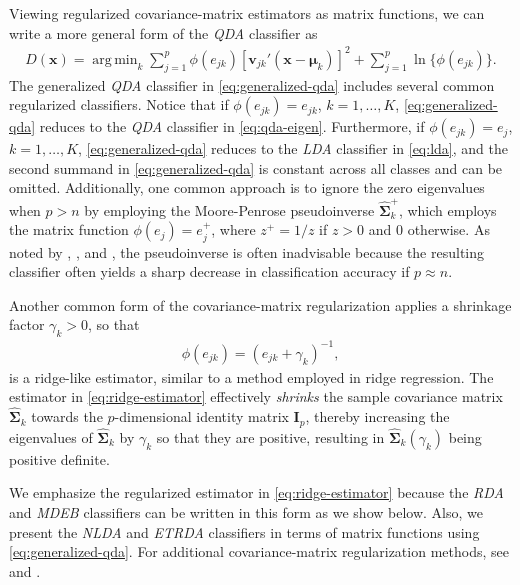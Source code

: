 \documentclass[11pt]{article}
\DeclareMathOperator*{\argmin}{arg\,min}
\begin{document}
Viewing regularized covariance-matrix estimators as matrix functions, we can write a more general form of the \emph{QDA} classifier as
\begin{align}
  D(\bm x) = \argmin_{k} \sum_{j = 1}^p \phi(e_{jk})[\bm v_{jk}' (\bm x - \bm \mu_k)]^2 + \sum_{j=1}^p \ln \{ \phi(e_{jk}) \}. \label{eq:generalized-qda}
\end{align}
The generalized \emph{QDA} classifier in \eqref{eq:generalized-qda} includes several common regularized classifiers. Notice that if  $\phi(e_{jk}) = e_{jk}$, $k = 1, \ldots, K$, \eqref{eq:generalized-qda} reduces to the \emph{QDA} classifier in \eqref{eq:qda-eigen}. Furthermore, if $\phi(e_{jk}) = e_{j}$, $k = 1, \ldots, K$, \eqref{eq:generalized-qda} reduces to the \emph{LDA} classifier in \eqref{eq:lda}, and the second summand in \eqref{eq:generalized-qda} is constant across all classes and can be omitted. Additionally, one common approach is to ignore the zero eigenvalues when $p > n$ by employing the Moore-Penrose pseudoinverse $\widehat{\bm \Sigma}_k^{+}$, which employs the matrix function $\phi(e_j) = e_j^{+}$, where $z^{+} = 1/z$ if $z > 0$ and $0$ otherwise. As noted by \cite{Hoyle:2011vt}, \cite{Raudys:1998dd}, and \cite{Ramey:2011ji}, the pseudoinverse is often inadvisable because the resulting classifier often yields a sharp decrease in classification accuracy if $p \approx n$.

Another common form of the covariance-matrix regularization applies a shrinkage factor $\gamma_k > 0$, so that
\begin{align}
	\phi(e_{jk}) = (e_{jk} + \gamma_k)^{-1}, \label{eq:ridge-estimator}
\end{align}
is a ridge-like estimator, similar to a method employed in ridge regression. The estimator in \eqref{eq:ridge-estimator} effectively \emph{shrinks} the sample covariance matrix $\widehat{\bm\Sigma}_k$ towards the $p$-dimensional identity matrix $\bm I_p$, thereby increasing the eigenvalues of $\widehat{\bm\Sigma}_k$ by $\gamma_k$ so that they are positive, resulting in $\widehat{\bm \Sigma}_k(\gamma_k)$ being positive definite.

We emphasize the regularized estimator in \eqref{eq:ridge-estimator} because the \emph{RDA} and \emph{MDEB} classifiers can be written in this form as we show below. Also, we present the \emph{NLDA} and \emph{ETRDA} classifiers in terms of matrix functions using \eqref{eq:generalized-qda}. For additional covariance-matrix regularization methods, see \cite{Ye:2009gd} and \cite{Ramey:2011ji}.
\end{document}

